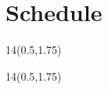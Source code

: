 


\section{Schedule}
\renewcommand{\arraystretch}{1}
\begin{frame}{}
	\begin{textblock}{14}(0.5,1.75)
	\def\myfontsize{footnotesize}
	
	\end{textblock}
\end{frame}



\begin{frame}{}
\renewcommand{\arraystretch}{1}
	\begin{textblock}{14}(0.5,1.75)
	\def\myfontsize{footnotesize}
	
	\end{textblock}
\end{frame}




